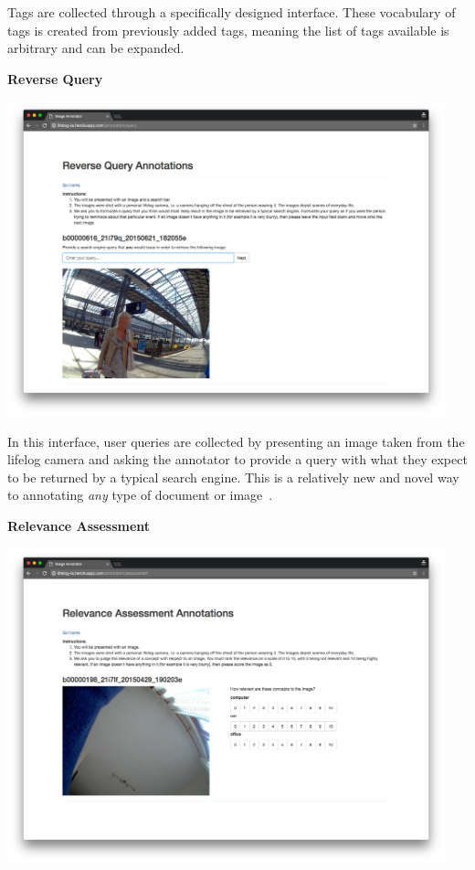 Tags are collected through a specifically designed interface. These vocabulary of tags is created from previously added tags, meaning the list of tags available is arbitrary and can be expanded. 

\newpage
\textbf{Reverse Query}

\includegraphics[width=0.95\textwidth]{images/query-interface}

In this interface, user queries are collected by presenting an image taken from the lifelog camera and asking the annotator to provide a query with what they expect to be returned by a typical search engine. This is a relatively new and novel way to annotating \textit{any} type of document or image~\cite{quteprints82599}. 

\newpage
\textbf{Relevance Assessment}

\includegraphics[width=0.95\textwidth]{images/rel-ass-interface}

